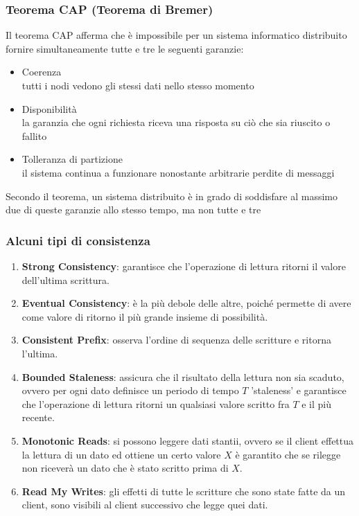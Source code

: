 \begin{frame}
\frametitle{Teorema CAP (Teorema di Bremer)}
	\begin{definizione}
	 Il \alert{teorema CAP} afferma che è impossibile per un sistema informatico distribuito fornire simultaneamente tutte e tre le seguenti garanzie:
	\begin{itemize}
		\item Coerenza\\
		tutti i nodi vedono gli stessi dati nello stesso momento
		\item Disponibilità\\
	    la garanzia che ogni richiesta riceva una risposta su ciò che sia riuscito o fallito
		\item Tolleranza di partizione\\
		il sistema continua a funzionare nonostante arbitrarie perdite di messaggi
	\end{itemize}
	Secondo il teorema, un sistema distribuito è in grado di soddisfare al massimo due di queste garanzie allo stesso tempo, ma non tutte e tre
	\end{definizione}
\end{frame}

\begin{frame}
\frametitle{Alcuni tipi di consistenza}
\begin{enumerate}
  \item \textbf{Strong Consistency}: garantisce che l'operazione di lettura ritorni il valore dell'ultima scrittura.
  \item \textbf{Eventual Consistency}: è la più debole delle altre, poiché permette di avere come valore di ritorno il più grande insieme di possibilità.
  \item \textbf{Consistent Prefix}: osserva l'ordine di sequenza delle scritture e ritorna l'ultima.
  \item \textbf{Bounded Staleness}: assicura che il risultato della lettura non sia scaduto, ovvero per ogni dato definisce un periodo di tempo $T$ 'staleness' e garantisce che l'operazione di lettura ritorni un qualsiasi valore scritto fra $T$ e il più recente.
  \item \textbf{Monotonic Reads}: si possono leggere dati stantii, ovvero se il client effettua la lettura di un dato ed ottiene un certo valore $X$ è garantito che se rilegge non riceverà un dato che è stato scritto prima di $X$. 
  \item \textbf{Read My Writes}: gli effetti di tutte le scritture che sono state fatte da un client, sono visibili al client successivo che legge quei dati.
\end{enumerate}
\end{frame}

